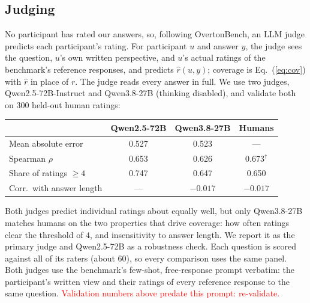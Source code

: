 \documentclass[11pt]{article}
\begin{document}
\subsection{Judging}
\label{sec:judges}
No participant has rated our answers, so, following OvertonBench, an LLM judge
predicts each participant's rating. For participant $u$ and answer $y$, the
judge sees the question, $u$'s own written perspective, and $u$'s actual
ratings of the benchmark's reference responses, and predicts $\hat r(u, y)$;
coverage is Eq.~(\ref{eq:cov}) with $\hat r$ in place of $r$. The judge reads
every answer in full. We use two judges, Qwen2.5-72B-Instruct and Qwen3.8-27B
(thinking disabled), and validate both on 300 held-out human ratings:

\begin{center}
\small
\begin{tabular}{@{}lccc@{}}
\toprule
 & Qwen2.5-72B & Qwen3.8-27B & Humans \\
\midrule
Mean absolute error            & 0.527 & 0.523 & --- \\
Spearman $\rho$                & 0.653 & 0.626 & 0.673$^\dagger$ \\
Share of ratings $\ge 4$       & 0.747 & 0.647 & 0.650 \\
Corr.\ with answer length      & ---   & $-0.017$ & $-0.017$ \\
\bottomrule
\end{tabular}
\end{center}

Both judges predict individual ratings about equally well, but only
Qwen3.8-27B matches humans on the two properties that drive coverage: how
often ratings clear the threshold of $4$, and insensitivity to answer length.
We report it as the primary judge and Qwen2.5-72B as a robustness check. Each
question is scored against all of its raters (about 60), so every comparison
uses the same panel. Both judges use the benchmark's few-shot, free-response
prompt verbatim: the participant's written view and their ratings of every
reference response to the same question.
\textcolor{red}{Validation numbers above predate this prompt: re-validate.}
\end{document}
